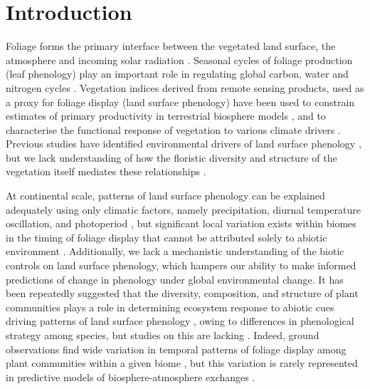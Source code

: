 \documentclass[11pt,a4paper]{article}
\begin{document}
\newpage{}

\section{Introduction}

Foliage forms the primary interface between the vegetated land surface, the
atmosphere and incoming solar radiation \citep{Gu2003, Penuelas2009}. Seasonal
cycles of foliage production (leaf phenology) play an important role in
regulating global carbon, water and nitrogen cycles \citep{Garonna2016}.
Vegetation indices derived from remote sensing products, used as a proxy for
foliage display (land surface phenology) have been used to constrain estimates
of primary productivity in terrestrial biosphere models \citep{Bloom2016,
Helman2018}, and to characterise the functional response of vegetation to
various climate drivers \citep{Richardson2013}. Previous studies have
identified environmental drivers of land surface phenology \citep{Adole2019,
Guan2014}, but we lack understanding of how the floristic diversity and
structure of the vegetation itself mediates these relationships
\citep{Whitley2017, Pau2011}. 

At continental scale, patterns of land surface phenology can be explained
adequately using only climatic factors, namely precipitation, diurnal
temperature oscillation, and photoperiod \citep{Adole2018a, Adole2019,
Guan2014}, but significant local variation exists within biomes in the timing
of foliage display that cannot be attributed solely to abiotic environment
\citep{Stockli2011}. Additionally, we lack a mechanistic understanding of the
biotic controls on land surface phenology, which hampers our ability to make
informed predictions of change in phenology under global environmental change.
It has been repeatedly suggested that the diversity, composition, and structure
of plant communities plays a role in determining ecosystem response to abiotic
cues driving patterns of land surface phenology \citep{Adole2018b,
Jeganathan2014, Fuller1999}, owing to differences in phenological strategy
among species, but studies on this are lacking \citep{Ma2022}. Indeed, ground
observations find wide variation in temporal patterns of foliage display among
plant communities within a given biome \citep{Seyednasrollah2019}, but this
variation is rarely represented in predictive models of biosphere-atmosphere
exchanges \citep{Scheiter2013, Pavlick2013}.
\end{document}
